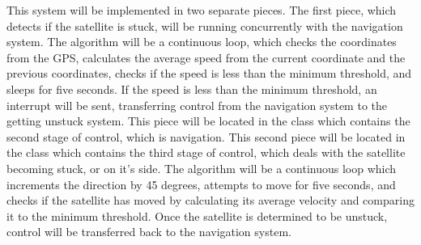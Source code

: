 \documentclass[10pt,letterpaper,onecolumn,journal]{IEEEtran}
\begin{document}
This system will be implemented in two separate pieces. The first piece, which detects if the satellite is stuck, will be running concurrently with the navigation system. The algorithm will be a continuous loop, which checks the coordinates from the GPS, calculates the average speed from the current coordinate and the previous coordinates, checks if the speed is less than the minimum threshold, and sleeps for five seconds. If the speed is less than the minimum threshold, an interrupt will be sent, transferring control from the navigation system to the getting unstuck system. This piece will be located in the class which contains the second stage of control, which is navigation. This second piece will be located in the class which contains the third stage of control, which deals with the satellite becoming stuck, or on it’s side. The algorithm will be a continuous loop which increments the direction by 45 degrees, attempts to move for five seconds, and checks if the satellite has moved by calculating its average velocity and comparing it to the minimum threshold. Once the satellite is determined to be unstuck, control will be transferred back to the navigation system.\vspace{.3cm}
\par
\end{document}
